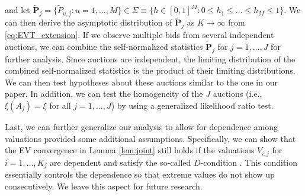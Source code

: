 and let $\mathbf{\tilde{P}}_{j}=\{\tilde{P}_{u,j}:u=1,\dots ,M\}\in \Sigma \equiv \{h\in [0,1]^{M}:0\leq h_{1}\leq \dots \leq h_{M}\leq 1\}$. We can then derive the asymptotic distribution of $\mathbf{\tilde{P}}_{j}$ as $ K\rightarrow \infty $ from \eqref{eq:EVT_extension}. If we observe multiple bids from several independent auctions, we can combine the self-normalized statistics $ \mathbf{\tilde{P}}_{j}$ for $j=1,\dots, J$ for further analysis. Since auctions are independent, the limiting distribution of the combined self-normalized statistics is the product of their limiting distributions. We can then test hypotheses about these auctions similar to the one in our paper. In addition, we can test the homogeneity of the $J$ auctions (i.e., $\xi ( A_{j}) =\xi $ for all $j=1,\dots, J$) by using a generalized likelihood ratio test.

Last, we can further generalize our analysis to allow for dependence among valuations provided some additional assumptions. Specifically, we can show that the EV convergence in Lemma \ref{lem:joint} still holds if the valuations $V_{i,j}$ for $i=1,\dots,K_j$ are dependent and satisfy the so-called $D$-condition \citep[e.g.,][]{o1974limit, leadbetter1982extremes}. This condition essentially controls the dependence so that extreme values do not show up consecutively. We leave this aspect for future research. 




